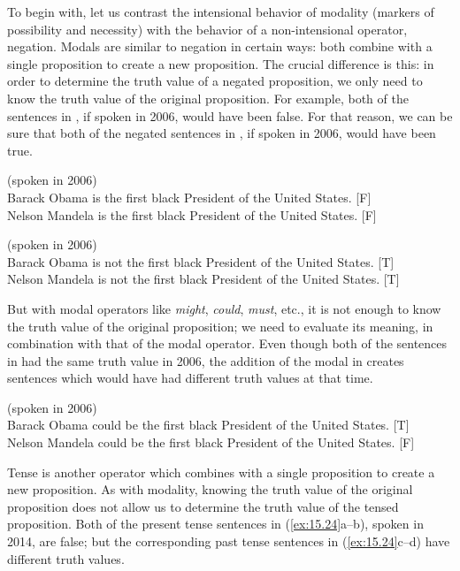 To begin with, let us contrast the intensional behavior of modality (markers of possibility and necessity) with the behavior of a non-intensional operator, negation. Modals are similar to negation in certain ways: both combine with a single proposition to create a new proposition. The crucial difference is this: in order to determine the truth value of a negated proposition, we only need to know the truth value of the original proposition. For example, both of the sentences in , if spoken in 2006, would have been false. For that reason, we can be sure that both of the negated sentences in , if spoken in 2006, would have been true.


\ea \label{ex:15.21}
(spoken in 2006)\\
\ea  Barack Obama is the first black President of the United States. \hfill  [F]\\
\ex Nelson Mandela is the first black President of the United States.  \hfill [F]
                       \z
\z

\ea \label{ex:15.22}
(spoken in 2006)\\
\ea  Barack Obama is not the first black President of the United States. \hfill [T]\\
\ex Nelson Mandela is not the first black President of the United States.  \hfill [T]
                       \z
\z


But with modal operators like \textit{might}, \textit{could}, \textit{must}, etc., it is not enough to know the truth value of the original proposition; we need to evaluate its meaning, in combination with that of the modal operator. Even though both of the sentences in  had the same truth value in 2006, the addition of the modal in  creates sentences which would have had different truth values at that time.


\ea \label{ex:15.23}
(spoken in 2006)\\
\ea  Barack Obama could be the first black President of the United States. \hfill  [T]\\
\ex Nelson Mandela could be the first black President of the United States. \hfill  [F]
                       \z
\z


Tense is another operator which combines with a single proposition to create a new proposition. As with modality, knowing the truth value of the original proposition does not allow us to determine the truth value of the tensed proposition. Both of the present tense sentences in (\ref{ex:15.24}a--b), spoken in 2014, are false; but the corresponding past tense sentences in (\ref{ex:15.24}c--d) have different truth values.


